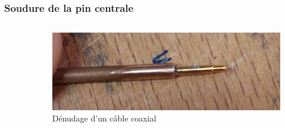 \documentclass[8pt,a9paper]{beamer} \usepackage[utf8]{inputenc} \usepackage[francais]{babel} \usepackage[T1]{fontenc}
\begin{document}
\begin{frame}
\frametitle{Soudure de la pin centrale}
\begin{columns}
\begin{column}{0.7\textwidth}
    \begin{description}
        \item[]~\\
    \end{description}
\end{column}
\begin{column}{0.3\textwidth}
\begin{figure}[h]
    \begin{center}
        \includegraphics[width=\textwidth]{Images/Coax/3}
        \caption{Dénudage d'un câble coaxial}
    \end{center}
\end{figure}
\end{column}
\end{columns}
\end{frame}
\end{document}
